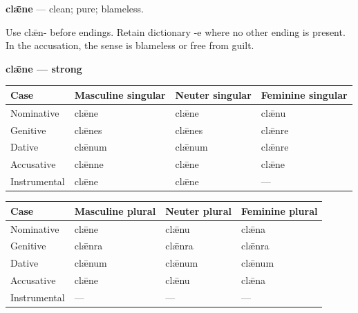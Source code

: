 \par\begin{minipage}{\linewidth}\raggedright
\textbf{clǣne} — clean; pure; blameless.

Use clǣn- before endings. Retain dictionary -e where no other ending is present. In the accusation, the sense is blameless or free from guilt.

\textbf{clǣne — strong}

\par\begingroup
\fontsize{10.5}{13.2}\selectfont
\setlength{\LTleft}{0pt}\setlength{\LTright}{\fill}
\noindent
\begin{tabular}{@{}>{\raggedright\arraybackslash}p{22.0mm}>{\raggedright\arraybackslash}p{31.188mm}>{\raggedright\arraybackslash}p{31.188mm}>{\raggedright\arraybackslash}p{31.188mm}@{}}
\toprule
\textbf{Case} & \textbf{Masculine singular} & \textbf{Neuter singular} & \textbf{Feminine singular} \\
\midrule
Nominative & clǣne & clǣne & clǣnu \\
Genitive & clǣnes & clǣnes & clǣnre \\
Dative & clǣnum & clǣnum & clǣnre \\
Accusative & clǣnne & clǣne & clǣne \\
Instrumental & clǣne & clǣne & — \\
\bottomrule
\end{tabular}
\par\endgroup
\end{minipage}\par
\par\addvspace{5pt}
\par\begingroup
\fontsize{10.5}{13.2}\selectfont
\setlength{\LTleft}{0pt}\setlength{\LTright}{\fill}
\noindent
\begin{tabular}{@{}>{\raggedright\arraybackslash}p{22.0mm}>{\raggedright\arraybackslash}p{31.188mm}>{\raggedright\arraybackslash}p{31.188mm}>{\raggedright\arraybackslash}p{31.188mm}@{}}
\toprule
\textbf{Case} & \textbf{Masculine plural} & \textbf{Neuter plural} & \textbf{Feminine plural} \\
\midrule
Nominative & clǣne & clǣnu & clǣna \\
Genitive & clǣnra & clǣnra & clǣnra \\
Dative & clǣnum & clǣnum & clǣnum \\
Accusative & clǣne & clǣnu & clǣna \\
Instrumental & — & — & — \\
\bottomrule
\end{tabular}
\par\endgroup

